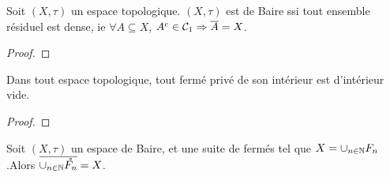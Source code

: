 \begin{proposition}
	Soit $(X, \tau)$ un espace topologique.
	$(X, \tau)$ est de Baire ssi tout ensemble résiduel est dense, ie $\forall A
	\subseteq X$, $A^{c} \in \mathcal{C}_{1} \Rightarrow \overline{A} = X$.
\end{proposition}

\begin{proof}
	
\end{proof}

\begin{proposition}
	Dans tout espace topologique, tout fermé privé de son intérieur est
	d'intérieur vide.
\end{proposition}

\begin{proof}
	
\end{proof}

 \begin{proposition}
	Soit $(X, \tau)$ un espace de Baire, et  une
	suite de fermés tel que $X = \displaystyle\cup_{n \in \mathbb{N}}F_{n}$.Alors
	$\displaystyle\overline{\cup_{n \in \mathbb{N}}\mathring{F_{n}}} = X$.
\end{proposition}
